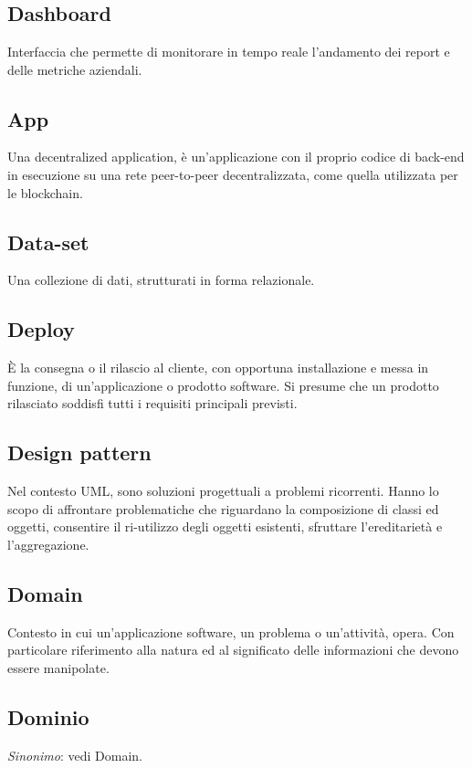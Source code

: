 \section{}
	\subsection*{Dashboard}
	Interfaccia che permette di monitorare in tempo reale l’andamento dei report e delle metriche aziendali.
	\subsection*{\DJ{}App}
	Una decentralized application, è un’applicazione con il proprio codice di back-end in esecuzione su una rete peer-to-peer decentralizzata, come quella utilizzata per le blockchain.
	\subsection*{Data-set}
	Una collezione di dati, strutturati in forma relazionale.
	\subsection*{Deploy}
	È la consegna o il rilascio al cliente, con opportuna installazione e messa in funzione, di un’applicazione o prodotto software. Si presume che un prodotto rilasciato soddisfi tutti i requisiti principali previsti.
	\subsection*{Design pattern}
	Nel contesto UML, sono soluzioni progettuali a problemi ricorrenti. Hanno lo scopo di affrontare problematiche che riguardano la composizione di classi ed oggetti, consentire il ri-utilizzo degli oggetti esistenti, sfruttare l’ereditarietà e l’aggregazione.
	\subsection*{Domain}
	Contesto in cui un’applicazione software, un problema o un’attività, opera. Con particolare riferimento alla natura ed al significato delle informazioni che devono essere manipolate.
	\subsection*{Dominio}
	\emph{Sinonimo}: vedi Domain.
\pagebreak
